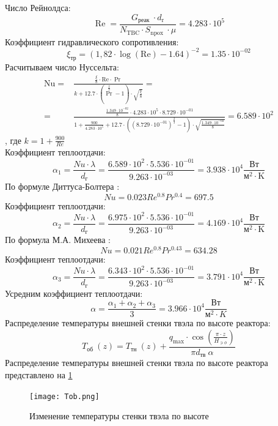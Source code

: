 Число Рейнолдса:
$$
\operatorname{Re}=\frac{G_{\text {реак }} \cdot d_{\mathrm{r}}}{N_{\mathrm{TBC}} \cdot S_{\text {npox }} \cdot \mu} = 4.283 \cdot 10^{ 5 }
$$
Коэффициент гидравлического сопротивления:
$$
\xi_{\text{тр}}=(1,82 \cdot \log (\mathrm{Re})-1.64)^{-2}= 1.35 \cdot 10^{-02}
$$
Расчитываем число Нуссельта:
\begin{align*}
\mathrm{Nu}=&\frac{\frac{\xi}{8} \cdot \mathrm{Re} \cdot \operatorname{Pr}}{k+12.7 \cdot\left(\operatorname{Pr}^{\frac{2}{3}}-1\right) \cdot \sqrt{\frac{\xi}{8}}}
=\\=&
\frac{ 
    \frac{1.349 \cdot 10^{ -02 }}{8} \cdot 4.283 \cdot 10^{ 5 } \cdot 8.729 \cdot 10^{ -01 } 
}
{ 
    1 + \frac{900}{4.283 \cdot 10^{ 5 }} + 12.7 \cdot\left((8.729 \cdot 10^{ -01 })^{\frac{2}{3}}-1\right) \cdot \sqrt{\frac{1.349 \cdot 10^{ -02 }}{8}} 
} = 6.589 \cdot 10^{ 2 }
\end{align*}, где $k = 1 + \frac{900}{Re}$  \\
Коэффициент теплоотдачи:
    $$
    \alpha_1 = \frac {Nu \cdot \lambda} {d_\text{г}} = \frac {6.589 \cdot 10^{ 2 } \cdot 5.536 \cdot 10^{ -01 }}{9.263 \cdot 10^{ -03 }} = 3.938 \cdot 10^{ 4 } \frac {\text{Вт}}{\text{м}^2\cdot\mathrm{K}}
    $$
По формуле Диттуса-Болтера \cite{деев}:
    $$
    Nu = 0.023Re^{0.8}Pr^{0.4} = 697.5
    $$
Коэффициент теплоотдачи:
    $$
    \alpha_2 = \frac {Nu \cdot \lambda} {d_\text{г}} = \frac {6.975 \cdot 10^{ 2 } \cdot 5.536 \cdot 10^{ -01 }}{9.263 \cdot 10^{ -03 }} = 4.169 \cdot 10^{ 4 } \frac {\text{Вт}}{\text{м}^2\cdot\mathrm{K}}
    $$
По формула М.А. Михеева \cite{михеев}:
    $$
    Nu = 0.021Re^{0.8}Pr^{0.43} = 634.28
    $$
Коэффициент теплоотдачи:
    $$
    \alpha_3 = \frac {Nu \cdot \lambda} {d_\text{г}} = \frac {6.343 \cdot 10^{ 2 } \cdot 5.536 \cdot 10^{ -01 }}{9.263 \cdot 10^{ -03 }} = 3.791 \cdot 10^{ 4 } \frac {\text{Вт}}{\text{м}^2\cdot\mathrm{K}}
    $$
Усредним коэффициент теплоотдачи:
    $$
    \alpha = \frac {\alpha_1 + \alpha_2 + \alpha_3} {3} = 3.966 \cdot 10^{ 4 } \frac{\text{Вт}}{\text{м}^2 \cdot K}
    $$
Распределение температуры внешней стенки твэла по высоте реактора:
    $$
    T_{\text {об }}(z)=T_{\text {тн }}(z)+\frac{q_{\max } \cdot \cos \left(\frac{\pi \cdot z}{H_{\ni \phi}}\right)}{\pi d_{\text {тв }} \alpha}
    $$
Распределение температуры внешней стенки
твэла по высоте реактора представлено на \ref{pic:Tob}

\begin{figure}[H]
	\begin{center}
		\texttt{[image: Tob.png]}
		\caption{Изменение температуры стенки твэла по высоте}
		\label{pic:Tob} %
	\end{center}
\end{figure}

